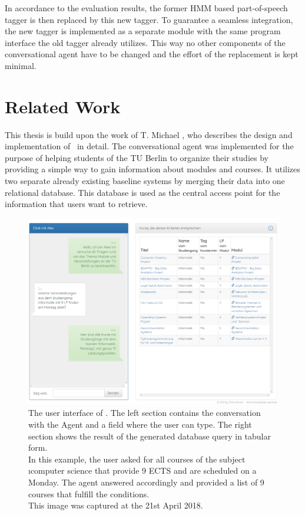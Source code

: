 In accordance to the evaluation results, the former HMM based part-of-speech tagger is then replaced by this new tagger. To guarantee a seamless integration, the new tagger is implemented as a separate module with the same program interface the old tagger already utilizes. This way no other components of the conversational agent have to be changed and the effort of the replacement is kept minimal.

\section{Related Work}\label{c.introduction.related}
This thesis is build upon the work of T. Michael \cite{michael2016}, who describes the design and implementation of \Alex\ in detail. The conversational agent was implemented for the purpose of helping students of the TU Berlin to organize their studies by providing a simple way to gain information about modules and courses. It utilizes two separate already existing baseline systems by merging their data into one relational database. This database is  used as the central access point for the information that users want to retrieve.

\begin{figure}[H]
	\includegraphics[width=\textwidth]{images/alex_screencapture}
	\caption[User Interface of \Alex]{The user interface of \Alex. The left section contains the conversation with the Agent and a field where the user can type. The right section shows the result of the generated database query in tabular form.\\In this example, the user asked for all courses of the subject \i{computer science} that provide 9 ECTS and are scheduled on a Monday. The agent answered accordingly and provided a list of 9 courses that fulfill the conditions.\\This image was captured at the 21st April 2018.}
	\label{f.alex_ui}
\end{figure}

